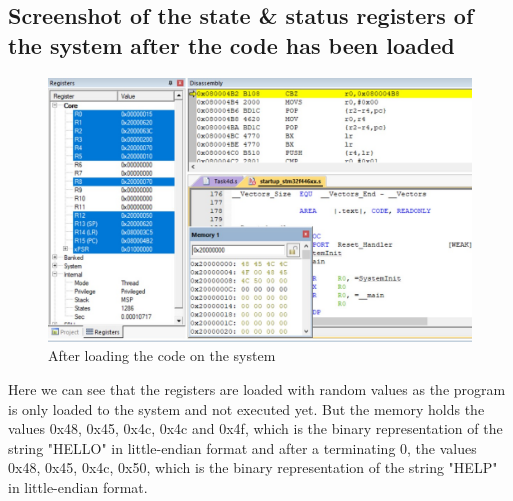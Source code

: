 \documentclass[footheight=20pt, footsepline, headheight=20pt, headsepline]{scrartcl}
\begin{document}
\FloatBarrier
\subsection*{Screenshot of the state \& status registers of the system after the code has been loaded}
\begin{figure}[ht]
    \centering
    \includegraphics[scale=.7]{images/Task4d_Before1.jpg}
    \caption{After loading the code on the system}
    \label{fig:before_task_4d}
\end{figure}
\FloatBarrier
Here we can see that the registers are loaded with random values as the program is only loaded to the system and not executed yet. But the memory holds the values 0x48, 0x45, 0x4c, 0x4c and 0x4f, which is the binary representation of the string "HELLO" in little-endian format and after a terminating 0, the values 0x48, 0x45, 0x4c, 0x50, which is the binary representation of the string "HELP" in little-endian format.
\end{document}
